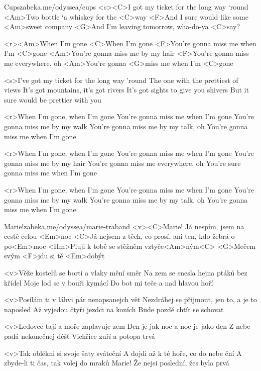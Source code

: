 \begin{song}{17}{Cups}{zabeka.me/odyssea/cups}
	<s><C>I got my ticket for the long way ‘round
	<Am>Two bottle ‘a whiskey for the <C>way
	<F>And I sure would like some <Am>sweet company
	<G>And I’m leaving tomorrow, wha-do-ya <C>say?

	<r><Am>When I’m gone
	<C>When I’m gone
	<F>You’re gonna miss me when I’m <C>gone
	<Am>You’re gonna miss me by my hair
	<F>You’re gonna miss me everywhere, oh
	<Am>You’re gonna <G>miss me when I’m <C>gone

	<s>I've got my ticket for the long way 'round
	The one with the prettiest of views
	It's got mountains, it's got rivers
	It's got sights to give you shivers
	But it sure would be prettier with you

	<r>When I'm gone, when I'm gone
	You're gonna miss me when I'm gone
	You're gonna miss me by my walk
	You're gonna miss me by my talk, oh
	You're gonna miss me when I'm gone

	<r>When I'm gone, when I'm gone
	You're gonna miss me when I'm gone
	You're gonna miss me by my hair
	You're gonna miss me everywhere, oh
	You're sure gonna miss me when I'm gone

	<r>When I'm gone, when I'm gone
	You're gonna miss me when I'm gone
	You're gonna miss me by my walk
	You're gonna miss me by my talk, oh
	You're gonna miss me when I'm gone
\end{song}
\begin{song}[Traband]{18}{Marie!}{zabeka.me/odyssea/marie-traband}
	<v><C>Marie! Já nespím, jsem na cestě celou <Em>noc
	<C>Já nejsem z těch, co prosí, ani ten, kdo žebrá o po<Em>moc
	<Hm>Pluji k tobě se stěžněm vztyče<Am>ným<C>
	<G>Mečem svým <F>jdu si tě <Em>dobýt

	<v>Věže kostelů se bortí a vlaky mění směr
	Na zem se snesla hejna ptáků bez křídel
	Moje loď se v bouři kymácí
	Do bot mi teče a nad hlavou hoří

	<v>Posílám ti v láhvi pár nenapsanejch vět
	Nezdráhej se přijmout, jen to, a je to naposled
	Až vyjedou čtyři jezdci na koních
	Bude pozdě chtít se schovat

	<v>Ledovce tají a moře zaplavuje zem
	Den je jak noc a noc je jako den
	Z nebe padá nekonečnej déšť
	Vichřice zuří a potopa trvá

	<v>Tak oblékni si svoje šaty sváteční
	A dojdi až k té hoře, co do nebe ční
	A zbyde-li ti čas, tak volej do mraků
	Marie! Že nejsi poslední, žes byla prvá
\end{song}

